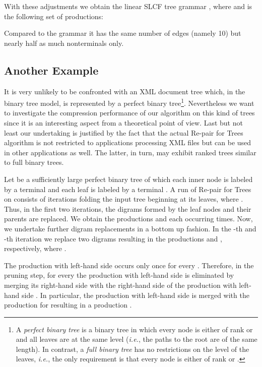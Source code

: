 \documentclass[12pt]{llncs}
\newcommand{\tp}{digram\xspace}
\newcommand{\tps}{digrams\xspace}
\newcommand{\hairsp}{\hspace{1pt}}\newcommand{\TODO}{\textcolor{red}{\bf TODO!}\xspace}
\newcommand{\ie}{\mbox{\textit{i.\hairsp{}e.}}\xspace}
\begin{document}
With these adjustments we obtain the linear SLCF tree grammar \label{exampleGrammar}, where  and  is the following set of productions:

Compared to the grammar  it has the same number of edges (namely 10) but nearly half as much nonterminals only.

\subsection{Another Example}

It is very unlikely to be confronted with an XML document tree which, in the binary tree model, is represented by a perfect binary tree\footnote{A \emph{perfect binary tree} is a binary tree in which every node is either of rank  or  and all leaves are at the same level (\ie, the paths to the root are of the same length). In contrast, a \emph{full binary tree} has no restrictions on the level of the leaves, \ie, the only requirement is that every node is either of rank  or .}. Nevertheless we want to investigate the compression performance of our algorithm on this kind of trees since it is an interesting aspect from a theoretical point of view. Last but not least our undertaking is justified by the fact that the actual Re-pair for Trees algorithm is not restricted to applications processing XML files but can be used in other applications as well. The latter, in turn, may exhibit ranked trees similar to full binary trees.

Let  be a sufficiently large perfect binary tree of which each inner node is labeled by a terminal  and each leaf is labeled by a terminal . A run of Re-pair for Trees on  consists of  iterations folding the input tree beginning at its leaves, where . Thus, in the first two iterations, the \tps formed by the leaf nodes and their parents are replaced. We obtain the productions  and  each occurring  times. Now, we undertake further \tp replacements in a bottom up fashion. 
In the -th and -th iteration we replace two \tps resulting in the productions  and , respectively, where . 

The production with left-hand side  occurs only once for every . Therefore, in the pruning step, for every  the production with left-hand side  is eliminated by merging its right-hand side with the right-hand side of the production with left-hand side . In particular, the production with left-hand side  is merged with the production for  resulting in a production .
\end{document}
